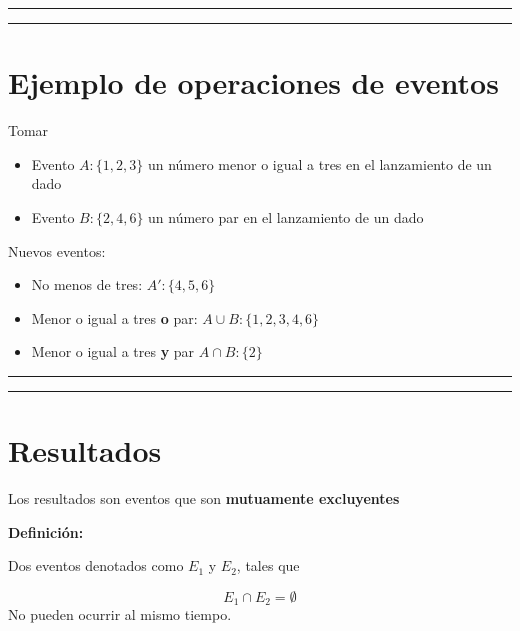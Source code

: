 \documentclass[
]{book}
\providecommand{\tightlist}{%
  \setlength{\itemsep}{0pt}\setlength{\parskip}{0pt}}
\begin{document}
\begin{center}\rule{0.5\linewidth}{0.5pt}\end{center}

\begin{center}\rule{0.5\linewidth}{0.5pt}\end{center}

\hypertarget{ejemplo-de-operaciones-de-eventos}{%
\section{Ejemplo de operaciones de eventos}\label{ejemplo-de-operaciones-de-eventos}}

Tomar

\begin{itemize}
\tightlist
\item
  Evento \(A:\{1,2,3\}\) un número menor o igual a tres en el lanzamiento de un dado
\item
  Evento \(B:\{2,4,6\}\) un número par en el lanzamiento de un dado
\end{itemize}

Nuevos eventos:

\begin{itemize}
\tightlist
\item
  No menos de tres: \(A':\{4,5,6\}\)
\item
  Menor o igual a tres \textbf{o} par: \(A \cup B: \{1,2,3,4,6\}\)
\item
  Menor o igual a tres \textbf{y} par \(A \cap B: \{2\}\)
\end{itemize}

\begin{center}\rule{0.5\linewidth}{0.5pt}\end{center}

\begin{center}\rule{0.5\linewidth}{0.5pt}\end{center}

\hypertarget{resultados}{%
\section{Resultados}\label{resultados}}

Los resultados son eventos que son \textbf{mutuamente excluyentes}

\textbf{Definición:}

Dos eventos denotados como \(E_1\) y \(E_2\), tales que

\[E_1\cap E_2=\emptyset\]
No pueden ocurrir al mismo tiempo.
\end{document}
